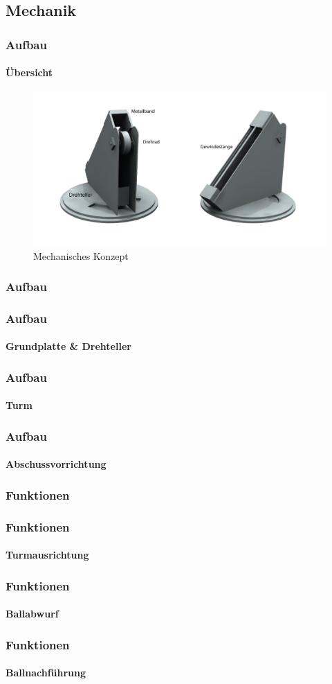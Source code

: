 \subsection{Mechanik}

\author{Christian Schürch}

\begin{frame}
	\frametitle{Aufbau\hfill{}\footnotesize \group}
	\framesubtitle{Übersicht}
	\begin{figure}
		\centering
		\includegraphics[width=1\textwidth]{../../fig/StudioLegende.png}
		\caption{Mechanisches Konzept}
	\end{figure}
\end{frame}

\subsubsection{Aufbau}
\begin{frame}
	\frametitle{Aufbau\hfill{}\footnotesize \group}
	\framesubtitle{Grundplatte \& Drehteller}
\end{frame}

\begin{frame}
	\frametitle{Aufbau\hfill{}\footnotesize \group}
	\framesubtitle{Turm}
\end{frame}

\begin{frame}
	\frametitle{Aufbau\hfill{}\footnotesize \group}
	\framesubtitle{Abschussvorrichtung}
\end{frame}

\subsubsection{Funktionen}
\begin{frame}
	\frametitle{Funktionen\hfill{}\footnotesize \group}
	\framesubtitle{Turmausrichtung}
\end{frame}

\begin{frame}
	\frametitle{Funktionen\hfill{}\footnotesize \group}
	\framesubtitle{Ballabwurf}
\end{frame}

\begin{frame}
	\frametitle{Funktionen\hfill{}\footnotesize \group}
	\framesubtitle{Ballnachführung}
\end{frame}
